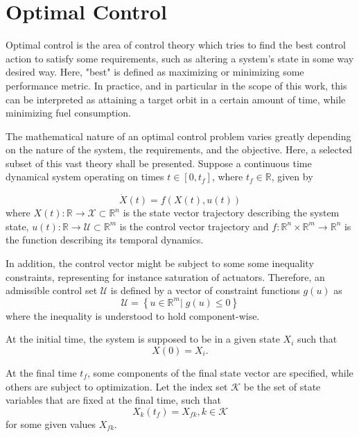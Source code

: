 \section{Optimal Control}

Optimal control is the area of control theory which tries to find the best control action to satisfy some requirements, such as altering a system's state in some way desired way. Here, "best" is defined as maximizing or minimizing some performance metric. In practice, and in particular in the scope of this work, this can be interpreted as attaining a target orbit in a certain amount of time, while minimizing fuel consumption.

The mathematical nature of an optimal control problem varies greatly depending on the nature of the system, the requirements, and the objective. Here, a selected subset of this vast theory shall be presented. Suppose a continuous time dynamical system operating on times \(t \in [0, t_f]\), where \(t_f \in \mathbb{R}\), given by

\begin{equation} \label{eq:generic_dyn}
    \dot X(t) = f(X(t), u(t))
\end{equation}
where \(X(t): \mathbb{R} \rightarrow \mathcal{X} \subset \mathbb{R}^n\) is the state vector trajectory describing the system state, \(u(t): \mathbb{R} \rightarrow \mathcal{U} \subset \mathbb{R}^m\) is the control vector trajectory and \(f: \mathbb{R}^n \times \mathbb{R}^m \rightarrow \mathbb{R}^n\) is the function describing its temporal dynamics. 

In addition, the control vector might be subject to some some inequality constraints, representing for instance saturation of actuators. Therefore, an admissible control set \(\mathcal{U}\) is defined by a vector of constraint functions \(g(u)\) as
\begin{equation}
    \mathcal{U} = \left\{u \in \mathbb{R}^m |\; g(u) \leq 0\right\}
\end{equation}
where the inequality is understood to hold component-wise.

At the initial time, the system is supposed to be in a given state \(X_i\) such that 
\begin{equation} \label{eq:generic_initial_constraint}
    X(0) = X_i.
\end{equation}

At the final time \(t_f\), some components of the final state vector are specified, while others are subject to optimization. Let the index set \(\mathcal{K}\) be the set of state variables that are fixed at the final time, such that
\begin{equation} \label{eq:generic_final_constraint}
    X_k(t_f) = X_{fk}, k\in \mathcal{K}
\end{equation}
for some given values \(X_{fk}\).

